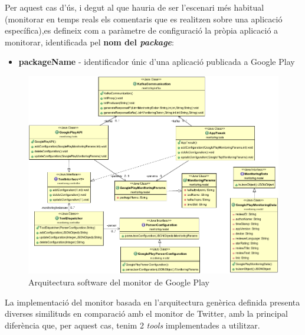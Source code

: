 Per aquest cas d'ús, i degut al que hauria de ser l'escenari més habitual (monitorar en temps reals els comentaris que es realitzen sobre una aplicació específica),es defineix com a paràmetre de configuració la pròpia aplicació a monitorar, identificada pel \textbf{nom del \textit{package}}:

\begin{itemize}
\item \textbf{packageName} - identificador únic d'una aplicació publicada a Google Play
\end{itemize}

\begin{figure}
\centering
\includegraphics[width=14cm]{Figures/Figure11}
\decoRule
\caption[Arquitectura software del monitor de Google Play]{Arquitectura software del monitor de Google Play}
\label{fig:Figura11}
\end{figure}

La implementació del monitor basada en l'arquitectura genèrica definida presenta diverses similituds en comparació amb el monitor de Twitter, amb la principal diferència que, per aquest cas, tenim 2 \textit{tools} implementades a utilitzar.

